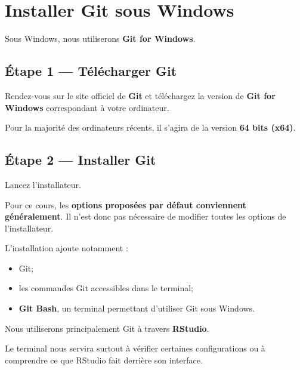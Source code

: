 \documentclass[
  letterpaper,
  DIV=11,
  numbers=noendperiod]{scrreprt}
\providecommand{\tightlist}{%
  \setlength{\itemsep}{0pt}\setlength{\parskip}{0pt}}\usepackage{longtable,booktabs,array}
\begin{document}
\section*{Installer Git sous Windows}\label{installer-git-sous-windows}


Sous Windows, nous utiliserons \textbf{Git for Windows}.

\subsection{Étape 1 --- Télécharger
Git}\label{uxe9tape-1-tuxe9luxe9charger-git}

Rendez-vous sur le site officiel de \textbf{Git} et téléchargez la
version de \textbf{Git for Windows} correspondant à votre ordinateur.

Pour la majorité des ordinateurs récents, il s'agira de la version
\textbf{64 bits (x64)}.

\subsection{Étape 2 --- Installer Git}\label{uxe9tape-2-installer-git}

Lancez l'installateur.

Pour ce cours, les \textbf{options proposées par défaut conviennent
généralement}. Il n'est donc pas nécessaire de modifier toutes les
options de l'installateur.

L'installation ajoute notamment :

\begin{itemize}
\tightlist
\item
  Git;
\item
  les commandes Git accessibles dans le terminal;
\item
  \textbf{Git Bash}, un terminal permettant d'utiliser Git sous Windows.
\end{itemize}

\begin{tcolorbox}[enhanced jigsaw, arc=.35mm, title=\textcolor{quarto-callout-tip-color}{\faLightbulb}\hspace{0.5em}{Pas besoin de devenir expert de Git Bash}, colback=white, left=2mm, rightrule=.15mm, toptitle=1mm, opacityback=0, bottomtitle=1mm, breakable, colframe=quarto-callout-tip-color-frame, coltitle=black, toprule=.15mm, titlerule=0mm, opacitybacktitle=0.6, bottomrule=.15mm, colbacktitle=quarto-callout-tip-color!10!white, leftrule=.75mm]

Nous utiliserons principalement Git à travers \textbf{RStudio}.

Le terminal nous servira surtout à vérifier certaines configurations ou
à comprendre ce que RStudio fait derrière son interface.

\end{tcolorbox}
\end{document}
